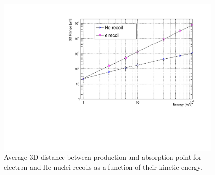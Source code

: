 \documentclass[physics,article,submit,moreauthors,pdftex]{Definitions/mdpi}
\newcommand{\lemon}{{\textsc{Lemon}}\xspace}
\begin{document}
\begin{figure}[t!]
  \begin{center}
    \includegraphics[width=0.49\linewidth]{range_ER_NR.pdf}
    \caption{Average 3D distance between production and absorption point for electron and He-nuclei recoils as a function of their kinetic energy.}
      \label{fig:range}
      \end{center}
\end{figure}








\end{document}
